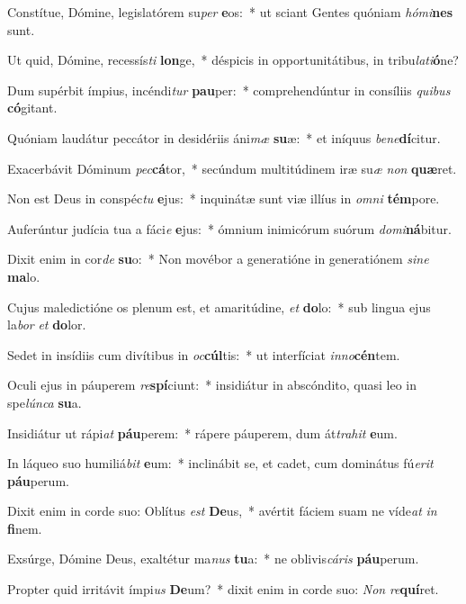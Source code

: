 \item Constítue, Dómine, legislatórem su\textit{per} \textbf{e}os:~* ut sciant Gentes quóniam \textit{hó}\textit{mi}\textbf{nes} sunt.
\item Ut quid, Dómine, recessís\textit{ti} \textbf{lon}ge,~* déspicis in opportunitátibus, in tribu\textit{la}\textit{ti}\textbf{ó}ne?
\item Dum supérbit ímpius, incéndi\textit{tur} \textbf{pau}per:~* comprehendúntur in consíliis \textit{qui}\textit{bus} \textbf{có}gitant.
\item Quóniam laudátur peccátor in desidériis áni\textit{mæ} \textbf{su}æ:~* et iníquus \textit{be}\textit{ne}\textbf{dí}citur.
\item Exacerbávit Dóminum \textit{pec}\textbf{cá}tor,~* secúndum multitúdinem iræ su\textit{æ} \textit{non} \textbf{quæ}ret.
\item Non est Deus in conspéc\textit{tu} \textbf{e}jus:~* inquinátæ sunt viæ illíus in \textit{om}\textit{ni} \textbf{tém}pore.
\item Auferúntur judícia tua a fáci\textit{e} \textbf{e}jus:~* ómnium inimicórum suórum \textit{do}\textit{mi}\textbf{ná}bitur.
\item Dixit enim in cor\textit{de} \textbf{su}o:~* Non movébor a generatióne in generatiónem \textit{si}\textit{ne} \textbf{ma}lo.
\item Cujus maledictióne os plenum est, et amaritúdine, \textit{et} \textbf{do}lo:~* sub lingua ejus la\textit{bor} \textit{et} \textbf{do}lor.
\item Sedet in insídiis cum divítibus in \textit{oc}\textbf{cúl}tis:~* ut interfíciat \textit{in}\textit{no}\textbf{cén}tem.
\item Oculi ejus in páuperem \textit{re}\textbf{spí}ciunt:~* insidiátur in abscóndito, quasi leo in spe\textit{lún}\textit{ca} \textbf{su}a.
\item Insidiátur ut rápi\textit{at} \textbf{páu}perem:~* rápere páuperem, dum át\textit{tra}\textit{hit} \textbf{e}um.
\item In láqueo suo humiliá\textit{bit} \textbf{e}um:~* inclinábit se, et cadet, cum dominátus fú\textit{e}\textit{rit} \textbf{páu}perum.
\item Dixit enim in corde suo: Oblítus \textit{est} \textbf{De}us,~* avértit fáciem suam ne víde\textit{at} \textit{in} \textbf{fi}nem.
\item Exsúrge, Dómine Deus, exaltétur ma\textit{nus} \textbf{tu}a:~* ne oblivis\textit{cá}\textit{ris} \textbf{páu}perum.
\item Propter quid irritávit ímpi\textit{us} \textbf{De}um?~* dixit enim in corde suo: \textit{Non} \textit{re}\textbf{quí}ret.
